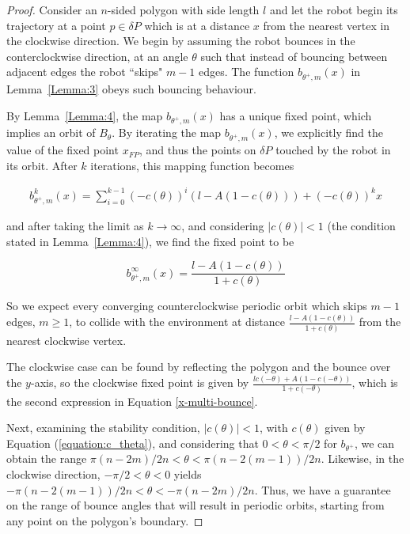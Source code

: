 \documentclass[letterpaper, 10 pt, conference]{ieeeconf}  %
\begin{document}
\begin{proof}
Consider an $n$-sided polygon with side length $l$ and let the robot begin its 
trajectory at a point $p \in \delta P$ which is at a distance $x$ from the nearest 
vertex in the clockwise direction. We begin by assuming the robot bounces 
in the conterclockwise direction, at an angle $\theta$ such that instead of 
bouncing between adjacent edges the robot ``skips" $m-1$ edges. The function $b_{\theta^+,m}(x)$  in 
Lemma~\ref{Lemma:3} obeys such bouncing behaviour.

By Lemma~\ref{Lemma:4}, the map $b_{\theta^+,m}(x)$ has a unique fixed point,
which implies an orbit of $B_{\theta}$. By iterating the map $b_{\theta^+,m}(x)$, 
we explicitly find the value of the fixed point $x_{FP}$, and thus the points 
on $\delta P$ touched by the robot in its orbit. After $k$ iterations, this mapping 
function becomes

\begin{equation*}
\begin{aligned}
b_{\theta^+, m}^k(x) = \sum_{i=0}^{k-1} (-c(\theta))^i (l-A(1-c(\theta))) + (-c(\theta))^k x
\end{aligned}
\end{equation*}

\noindent and after taking the limit as $k \to \infty$, and considering
$|c(\theta)| < 1$ (the condition stated in Lemma~\ref{Lemma:4}), 
we find the fixed point to be

\begin{equation} \label{b-multi-bounce}
b_{\theta^+, m}^{\infty}(x) = \frac{l-A(1-c(\theta))}{1+c(\theta)}
\end{equation}

So we expect every converging counterclockwise 
periodic orbit which skips $m-1$ edges,
$m \geq 1$, to collide with the environment at distance
$\frac{l-A(1-c(\theta))}{1+c(\theta)}$ from the nearest clockwise vertex. 


The clockwise case can be found by reflecting the polygon and the bounce over the
$y$-axis, so the clockwise fixed point is given by $\frac{lc(-\theta) + A(1-c(-\theta))}{1+c(-\theta)}$, which is the second expression in Equation \ref{x-multi-bounce}.

Next, examining the stability condition,
$|c(\theta)| < 1$, with $c(\theta)$ given by Equation (\ref{equation:c_theta}),
and considering that $0 < \theta < \pi/2$ for $b_{\theta^+}$, we can obtain 
the range $\pi(n-2m)/2n < \theta < \pi(n-2(m-1))/2n$. 
Likewise, in the clockwise direction, $-\pi/2 < \theta < 0$ yields $-\pi(n-2(m-1))/2n < \theta < -\pi(n-2m)/2n$. Thus, we have a guarantee on the range of bounce angles that
will result in periodic orbits, starting from any point on the polygon's
boundary.


\end{proof}
\end{document}
